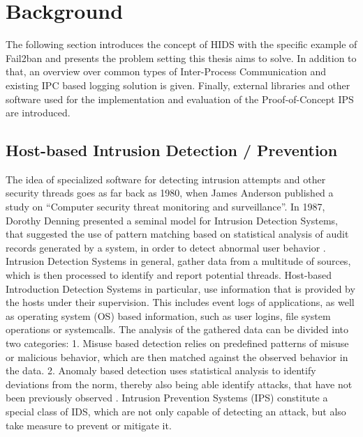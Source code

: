 %
%

\chapter{Background}
\label{sec:background}

The following section introduces the concept of \ac{HIDS} with the specific example of Fail2ban and presents the problem setting 
this thesis aims to solve. In addition to that, an overview over common types of Inter-Process Communication and existing IPC based logging solution is given. 
Finally, external libraries and other software used for the implementation and evaluation of the Proof-of-Concept IPS are introduced.    

\section{Host-based Intrusion Detection / Prevention}
\label{sec:hids}
The idea of specialized software for detecting intrusion attempts and other 
security threads goes as far back as 1980, when James Anderson published a study on 
``Computer security threat monitoring and surveillance''\cite{anderson1980}. In 1987, Dorothy
Denning presented a seminal model for Intrusion Detection Systems, that suggested the use of pattern matching based on
statistical analysis of audit records generated by a system, in order to detect abnormal user behavior \cite{denning1987}.         
Intrusion Detection Systems in general, gather data from a multitude of sources,
which is then processed to identify and report potential threads. Host-based Introduction Detection Systems in particular,
use information that is provided by the hosts under their supervision. This includes event logs of applications, as well as operating system (\ac{OS}) based information,
such as user logins, file system operations or systemcalls. The analysis of the gathered data can be divided into two categories: 1. Misuse based detection relies on predefined 
patterns of misuse or malicious behavior, which are then matched against the observed behavior in the data. 2. Anomaly based detection uses statistical analysis to identify deviations
from the norm, thereby also being able identify attacks, that have not been previously observed \cite{vigna2006}. Intrusion Prevention Systems (\ac{IPS}) constitute a special class of IDS, which
are not only capable of detecting an attack, but also take measure to prevent or mitigate it.


